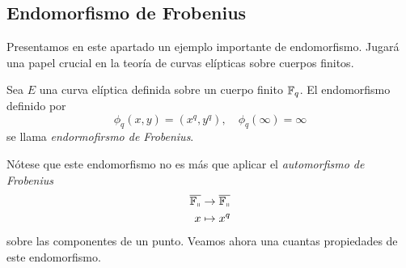 %
%


\subsection{Endomorfismo de Frobenius}
\label{sub:Endomorfismo de Frobenius}

Presentamos en este apartado un ejemplo importante de endomorfismo. Jugará una papel crucial en la teoría de curvas elípticas sobre cuerpos finitos.

\begin{definicion}
	Sea $E$ una curva elíptica definida sobre un cuerpo finito $\mathbb{F}_q$. El endomorfismo definido por
	$$
		\phi_q(x, y) = (x^q, y^q), \quad \phi_q(\infty) = \infty
	$$
	se llama \emph{endormofirsmo de Frobenius}.
\end{definicion}

Nótese que este endomorfismo no es más que aplicar el \emph{automorfismo de Frobenius}
\begin{align*}
	\mathbb{\overline{\mathbb{F}_q}} &\to \mathbb{\overline{\mathbb{F}_q}} \\
	x &\mapsto x^q
\end{align*}
sobre las componentes de un punto. Veamos ahora una cuantas propiedades de este endomorfismo.

